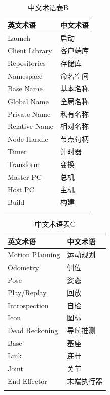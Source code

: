 \documentclass[geye,green,kindle,cn]{elegantnote}
\begin{document}
\begin{table}[htbp]
    \centering
    \caption{中文术语表B} \label{table:ChineseTermTableB}
    \begin{tabular}{p{80pt}<{\centering}p{80pt}<{\centering}}
    \Xhline{1.0pt}
    \textbf{英文术语} & 
    \textbf{中文术语} \\
    \hline
    Launch &
    启动 \\
    Client Library &
    客户端库 \\
    Repositories &
    存储库 \\
    Namespace &
    命名空间 \\
    Base Name &
    基本名称 \\
    Global Name &
    全局名称 \\
    Private Name &
    私有名称 \\
    Relative Name &
    相对名称 \\
    Node Handle &
    节点句柄 \\
    Timer &
    计时器 \\
    Transform &
    变换 \\
    Master PC &
    总机 \\
    Host PC &
    主机 \\
    Build &
    构建 \\
    \Xhline{1.0pt}
    \end{tabular}
\end{table}

\begin{table}[htbp]
    \centering
    \caption{中文术语表C} \label{table:ChineseTermTableC}
    \begin{tabular}{p{80pt}<{\centering}p{80pt}<{\centering}}
    \Xhline{1.0pt}
    \textbf{英文术语} & 
    \textbf{中文术语} \\
    \hline
    Motion Planning &
    运动规划 \\
    Odometry &
    侧位 \\
    Pose &
    姿态 \\
    Play/Replay &
    回放 \\
    Introspection &
    自检 \\
    Icon &
    图标 \\
    Dead Reckoning &
    导航推测 \\
    Base &
    基座 \\
    Link &
    连杆 \\
    Joint &
    关节 \\
    End Effector &
    末端执行器 \\
    \Xhline{1.0pt}
    \end{tabular}
\end{table}
\end{document}
